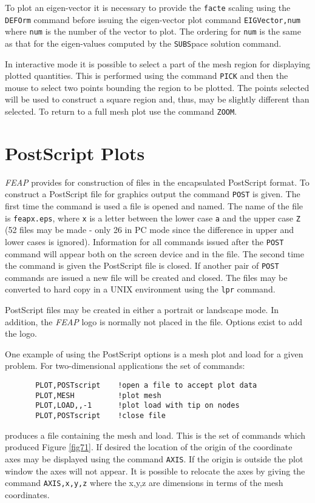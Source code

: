To plot an eigen-vector it is necessary to provide the {\tt facte} scaling using
the {\tt DEFOrm} command before issuing the eigen-vector plot command
{\tt EIGVector,num} where {\tt num} is the number of the vector to plot.
The ordering for {\tt num} is the same as that for the eigen-values computed
by the {\tt SUBS}pace solution command.

In interactive mode it is possible to select a part of the mesh region for
displaying plotted quantities.  This is performed using the command {\tt PICK}
and then the mouse to select two points bounding the region to be plotted.  
The points selected will be used to construct a square region and, thus,
may be slightly different than selected.  To return to a full mesh plot
use the command {\tt ZOOM}.

\section{PostScript Plots}
\label{postscript}

{\sl FEAP} provides for construction of files in the encapsulated 
PostScript format.  To
construct a PostScript file for graphics output the command {\tt POST}
is given.  The first time the command is used a file is opened and
named.  The name of the file is {\tt feapx.eps},
where {\tt x} is a letter between
the lower case {\tt a} and the upper case {\tt Z} (52 files may be made -
only
26 in PC mode since the difference in upper and lower cases is ignored).
Information for all commands issued after the {\tt POST} command will appear
both on the screen device and in the file.  The second time the command is
given the PostScript file is closed.  If another pair of {\tt POST} commands
are issued a new file will be created and closed.  The files may be converted
to hard copy in a UNIX environment using the {\tt lpr} command.

PostScript files may be created in either a portrait or landscape mode.
In addition, the {\sl FEAP} logo is normally not placed in the file.  Options
exist to add the logo.

One example of using the PostScript options is a mesh plot and load
for a given problem.  For two-dimensional applications the 
set of commands:
\begin{verbatim}
       PLOT,POSTscript    !open a file to accept plot data
       PLOT,MESH          !plot mesh
       PLOT,LOAD,,-1      !plot load with tip on nodes
       PLOT,POSTscript    !close file
\end{verbatim}
produces a file containing the mesh and load.
This is the set of commands which produced Figure \ref{fig71}.
If desired the location of the origin of the coordinate axes may be
displayed using the command {\tt AXIS}.  If the origin is outside the
plot window the axes will not appear.  It is possible to relocate the
axes by giving the command
{\tt AXIS,x,y,z} where the x,y,z are dimensions in terms of
the mesh coordinates.

